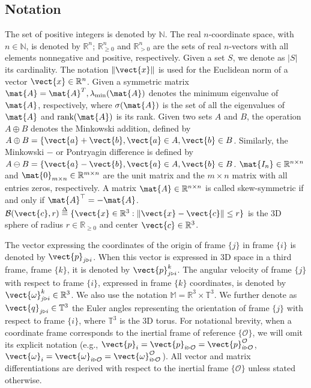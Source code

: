 \subsection{Notation}

The set of positive integers is denoted by $\mathbb{N}$. The real $n$-coordinate
space, with $n\in\mathbb{N}$, is denoted by $\mathbb{R}^n$;
$\mathbb{R}^n_{\geq 0}$ and $\mathbb{R}^n_{> 0}$ are the sets of real
$n$-vectors with all elements nonnegative and positive, respectively. Given a
set $S$, we denote as $\lvert S\lvert$ its cardinality. The notation
$\|\vect{x}\|$ is used for the Euclidean norm of a vector
$\vect{x} \in \mathbb{R}^n$. Given a symmetric matrix
$\mat{A} = \mat{A}^T, \lambda_{\text{min}}(\mat{A})$
denotes the minimum eigenvalue of $\mat{A}$, respectively, where
$\sigma(\mat{A})$ is the set of all the eigenvalues of
$\mat{A}$ and $\text{rank}(\mat{A})$ is its rank. Given two sets $A$ and $B$,
the operation $A \oplus B$ denotes the Minkowski addition, defined by
$A \oplus B = \{\vect{a} + \vect{b}, \vect{a} \in A, \vect{b} \in B$. Similarly,
the Minkowski $-$ or Pontryagin difference is defined by
$A \ominus B = \{\vect{a} - \vect{b}, \vect{a} \in A, \vect{b} \in B$.
$\mat{I_n} \in \mathbb{R}^{n \times n}$ and
$\mat{0}_{m \times n} \in \mathbb{R}^{m \times n}$
are the unit matrix and the $m \times n$ matrix with all entries zeros,
respectively.  A matrix $\mat{A} \in \mathbb{R}^{n \times n}$ is called
skew-symmetric if and only if $\mat{A}^\top = -\mat{A}$.
$\mathcal{B}(\vect{c},r) \overset{\Delta}{=} \{\vect{x} \in \mathbb{R}^3: \|\vect{x}-\vect{c}\| \leq r\}$
is the $3$D sphere of radius $r \in \mathbb{R}_{\ge 0}$ and center
$\vect{c}\in\mathbb{R}^{3}$.

The vector expressing the coordinates of the origin of frame $\{j\}$ in
frame $\{i\}$ is denoted by $\vect{p}_{j \triangleright i}$. When this vector is
expressed in 3D space in a third frame, frame $\{k\}$, it is denoted by
$\vect{p}_{j \triangleright i}^{k}$.
The angular velocity of frame $\{j\}$ with respect to frame $\{i\}$, expressed
in frame $\{k\}$ coordinates, is denoted by
$\vect{\omega}^k_{j \triangleright i}\in \mathbb{R}^{3}$.
We also use the notation $\mathbb{M} = \mathbb{R}^3\times \mathbb{T}^3$.
We further denote as $\vect{q}_{j \triangleright i} \in \mathbb{T}^3$
the Euler angles representing the orientation of frame $\{j\}$ with respect to
frame $\{i\}$, where $\mathbb{T}^3$ is the $3$D torus.
For notational brevity, when a coordinate frame corresponds to the inertial frame
of reference $\{\mathcal{O}\}$, we will omit its explicit notation
(e.g., $\vect{p}_i = \vect{p}_{i \triangleright \mathcal{O}} = \vect{p}^\mathcal{O}_{i \triangleright \mathcal{O}}$,
$\vect{\omega}_i = \vect{\omega}_{i \triangleright \mathcal{O}} = \vect{\omega}^\mathcal{O}_{i \triangleright \mathcal{O}}$).
All vector and matrix differentiations are derived with respect to the inertial
frame $\{\mathcal{O}\}$ unless stated otherwise.

